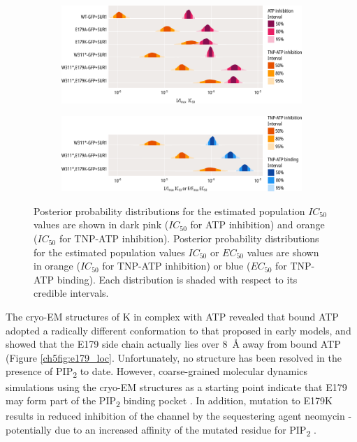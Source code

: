 \begin{figure}[hbtp]
	\centering
	\begin{subfigure}[t]{0.9\textwidth}
		\caption{}\label{ch5fig:e179_ec50_fits}
		\centering
		\includegraphics[width=\textwidth]{e179_5.pdf}
	\end{subfigure}
	\vfill
	\begin{subfigure}[t]{0.9\textwidth}
		\caption{}\label{ch5fig:e179_ec50_fits_2}
		\centering
		\includegraphics[width=\textwidth]{e179_6.pdf}
	\end{subfigure}
	\caption[E179 mutations $EC_{50}$ parameters]{
	 Posterior probability distributions for the estimated population $IC_{50}$ values are shown in dark pink ($IC_{50}$ for ATP inhibition) and orange ($IC_{50}$ for TNP-ATP inhibition).
	 Posterior probability distributions for the estimated population values $IC_{50}$ or $EC_{50}$ values are shown in orange ($IC_{50}$ for TNP-ATP inhibition) or blue ($EC_{50}$ for TNP-ATP binding).
	Each distribution is shaded with respect to its credible intervals.
	}\label{ch5fig:e179_1a}
\end{figure}

The cryo-EM structures of K\ATP{} in complex with ATP revealed that bound ATP adopted a radically different conformation to that proposed in early models, and showed that the E179 side chain actually lies over \SI{8}{\angstrom} away from bound ATP \cite{lee_molecular_2017, martin_anti-diabetic_2017, li_structure_2017, puljung_cryo-electron_2018-1} (Figure \ref{ch5fig:e179_loc}.
Unfortunately, no structure has been resolved in the presence of PIP\textsubscript{2} to date.
However, coarse-grained molecular dynamics simulations using the cryo-EM structures as a starting point indicate that E179 may form part of the PIP\textsubscript{2} binding pocket \cite{pipatpolkai_evaluating_2020}.
In addition, mutation to E179K results in reduced inhibition of the channel by the sequestering agent neomycin - potentially due to an increased affinity of the mutated residue for PIP\textsubscript{2} \cite{pipatpolkai_evaluating_2020}.

